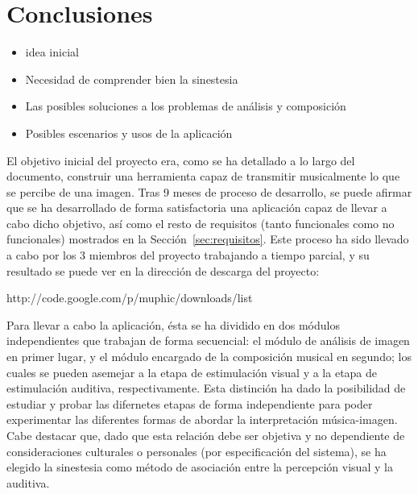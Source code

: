 \chapter{Conclusiones}
\label{chap:results}






\begin{itemize}
	
	\item idea inicial
	\item Necesidad de comprender bien la sinestesia
	\item Las posibles soluciones a los problemas de análisis y composición
	\item Posibles escenarios y usos de la aplicación

\end{itemize}

El objetivo inicial del proyecto era, como se ha detallado a lo largo del documento, construir una herramienta capaz de transmitir musicalmente lo que se percibe de una imagen. Tras 9 meses de proceso de desarrollo, se puede afirmar que se ha desarrollado de forma satisfactoria una aplicación capaz de llevar a cabo dicho objetivo, así como el resto de requisitos (tanto funcionales como no funcionales) mostrados en la Sección~\ref{sec:requisitos}. Este proceso ha sido llevado a cabo por los 3 miembros del proyecto trabajando a tiempo parcial, y su resultado se puede ver en la dirección de descarga del proyecto:\\

\begin{center}
http://code.google.com/p/muphic/downloads/list
\end{center}


Para llevar a cabo la aplicación, ésta se ha dividido en dos módulos independientes que trabajan de forma secuencial: el módulo de análisis de imagen en primer lugar, y el módulo encargado de la composición musical en segundo; los cuales se pueden asemejar a la etapa de estimulación visual y a la etapa de estimulación auditiva, respectivamente. Esta distinción ha dado la posibilidad de estudiar y probar las difernetes etapas de forma independiente para poder experimentar las diferentes formas de abordar la interpretación música-imagen. Cabe destacar que, dado que esta relación debe ser objetiva y no dependiente de consideraciones culturales o personales (por especificación del sistema), se ha elegido la sinestesia como método de asociación entre la percepción visual y la auditiva.\\


